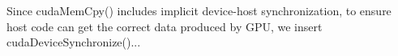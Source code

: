 Since cudaMemCpy() includes implicit device-host synchronization, to ensure host code can get the correct data produced by GPU, we insert cudaDeviceSynchronize()...
